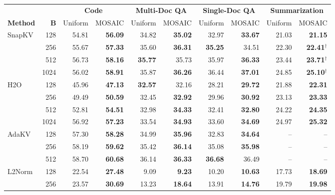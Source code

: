 \begin{tabular}{@{} l r rr rr rr rr @{}}
  \toprule
  & & \multicolumn{2}{c}{\textbf{Code}} & \multicolumn{2}{c}{\textbf{Multi-Doc QA}} & \multicolumn{2}{c}{\textbf{Single-Doc QA}} & \multicolumn{2}{c}{\textbf{Summarization}} \\
  \cmidrule(lr){3-4} \cmidrule(lr){5-6} \cmidrule(lr){7-8} \cmidrule(lr){9-10}
  \textbf{Method} & \textbf{B} & Uniform & MOSAIC & Uniform & MOSAIC & Uniform & MOSAIC & Uniform & MOSAIC \\
  \midrule
  \multirow{4}{*}{SnapKV} & 128 & 54.81 & \textbf{56.09} & 34.82 & \textbf{35.02} & 32.97 & \textbf{33.67} & 21.03 & \textbf{21.15} \\
   & 256 & 55.67 & \textbf{57.33} & 35.60 & \textbf{36.31} & \textbf{35.25} & 34.51 & 22.30 & \textbf{22.41}$^\dagger$ \\
   & 512 & 56.73 & \textbf{58.16} & \textbf{35.77} & 35.73 & 35.97 & \textbf{36.33} & 23.44 & \textbf{23.71}$^\dagger$ \\
   & 1024 & 56.02 & \textbf{58.91} & 35.87 & \textbf{36.26} & 36.44 & \textbf{37.01} & 24.85 & \textbf{25.10}$^\dagger$ \\
  \midrule
  \multirow{4}{*}{H2O} & 128 & 45.96 & \textbf{47.13} & \textbf{32.57} & 32.16 & 28.21 & \textbf{29.72} & 21.88 & \textbf{22.31} \\
   & 256 & 49.49 & \textbf{50.59} & 32.45 & \textbf{32.92} & 29.96 & \textbf{30.92} & 23.13 & \textbf{23.33} \\
   & 512 & 52.81 & \textbf{54.51} & 32.98 & \textbf{34.33} & 32.41 & \textbf{32.80} & 24.22 & \textbf{24.35} \\
   & 1024 & 56.92 & \textbf{57.23} & 33.54 & \textbf{34.93} & 33.60 & \textbf{34.69} & 24.97 & \textbf{25.32} \\
  \midrule
  \multirow{3}{*}{AdaKV} & 128 & 57.30 & \textbf{58.28} & 34.99 & \textbf{35.96} & 32.83 & \textbf{34.64} & -- & -- \\
   & 256 & 58.19 & \textbf{59.62} & 35.42 & \textbf{36.14} & 35.08 & \textbf{35.98} & -- & -- \\
   & 512 & 58.70 & \textbf{60.68} & 36.14 & \textbf{36.33} & \textbf{36.68} & 36.49 & -- & -- \\
  \midrule
  \multirow{4}{*}{L2Norm} & 128 & 22.54 & \textbf{27.48} & 9.09 & \textbf{9.23} & 10.20 & \textbf{10.63} & 17.73 & \textbf{18.69} \\
   & 256 & 23.57 & \textbf{30.69} & 13.23 & \textbf{18.64} & 13.91 & \textbf{14.76} & 19.79 & \textbf{19.98} \\

\end{tabular}
